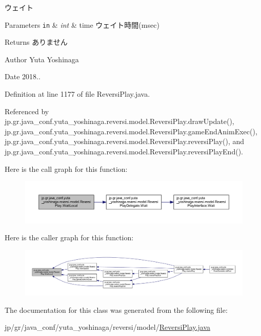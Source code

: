 ウェイト 


\begin{DoxyParams}[1]{Parameters}
\mbox{\tt in}  & {\em int} & time ウェイト時間(msec) \\
\hline
\end{DoxyParams}
\begin{DoxyReturn}{Returns}
ありません 
\end{DoxyReturn}
\begin{DoxyAuthor}{Author}
Yuta Yoshinaga 
\end{DoxyAuthor}
\begin{DoxyDate}{Date}
2018.. 
\end{DoxyDate}


Definition at line 1177 of file Reversi\+Play.\+java.



Referenced by jp.\+gr.\+java\+\_\+conf.\+yuta\+\_\+yoshinaga.\+reversi.\+model.\+Reversi\+Play.\+draw\+Update(), jp.\+gr.\+java\+\_\+conf.\+yuta\+\_\+yoshinaga.\+reversi.\+model.\+Reversi\+Play.\+game\+End\+Anim\+Exec(), jp.\+gr.\+java\+\_\+conf.\+yuta\+\_\+yoshinaga.\+reversi.\+model.\+Reversi\+Play.\+reversi\+Play(), and jp.\+gr.\+java\+\_\+conf.\+yuta\+\_\+yoshinaga.\+reversi.\+model.\+Reversi\+Play.\+reversi\+Play\+End().

Here is the call graph for this function\+:
\nopagebreak
\begin{figure}[H]
\begin{center}
\leavevmode
\includegraphics[width=350pt]{classjp_1_1gr_1_1java__conf_1_1yuta__yoshinaga_1_1reversi_1_1model_1_1_reversi_play_aec398cf0d2ac7bd1d1b64be67bcadde2_cgraph}
\end{center}
\end{figure}
Here is the caller graph for this function\+:
\nopagebreak
\begin{figure}[H]
\begin{center}
\leavevmode
\includegraphics[width=350pt]{classjp_1_1gr_1_1java__conf_1_1yuta__yoshinaga_1_1reversi_1_1model_1_1_reversi_play_aec398cf0d2ac7bd1d1b64be67bcadde2_icgraph}
\end{center}
\end{figure}


The documentation for this class was generated from the following file\+:\begin{DoxyCompactItemize}
\item 
jp/gr/java\+\_\+conf/yuta\+\_\+yoshinaga/reversi/model/\hyperlink{_reversi_play_8java}{Reversi\+Play.\+java}\end{DoxyCompactItemize}

